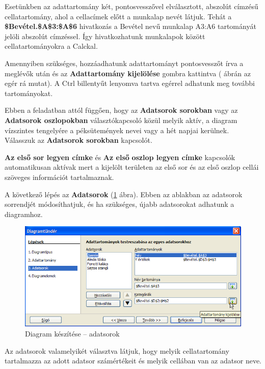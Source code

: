 Esetünkben az adattartomány két, pontosvesszővel
elválasztott, abszolút címzésű cellatartomány, ahol a
cellacímek előtt a munkalap nevét látjuk. Tehát a
\textbf{\$Bevétel.\$A\$3:\$A\$6} hivatkozás a Bevétel nevű
munkalap A3:A6 tartományát jelöli abszolút címzéssel. Így
hivatkozhatunk munkalapok között cellatartományokra a Calckal.

Amennyiben szükséges, hozzáadhatunk adattartományt
pontosvesszőt írva a meglévők után és az
\textbf{Adattartomány kijelölése} gombra kattintva (
ábrán az egér rá mutat). A Ctrl billentyűt lenyomva tartva
egérrel adhatunk meg további tartományokat. 

Ebben a feladatban attól függően, hogy az \textbf{Adatsorok
sorokban} vagy az \textbf{Adatsorok oszlopokban} választókapcsoló
közül melyik aktív, a diagram vízszintes tengelyére a
péksütemények nevei vagy a hét napjai kerülnek. Válasszuk
az \textbf{Adatsorok sorokban} kapcsolót.

\textbf{Az első sor legyen címke} és \textbf{Az
első}\textbf{ oszlop legyen címke} kapcsolók
automatikusan aktívak mert  a kijelölt területen az első sor
és az első oszlop cellái szöveges információt
tartalmaznak.

A következő lépés az \textbf{Adatsorok} (\ref{DiagramAdatsor} ábra).
Ebben az ablakban az adatsorok sorrendjét módosíthatjuk, és ha
szükséges, újabb adatsorokat adhatunk a diagramhoz.

\begin{figure}[!h]
\begin{center}
\includegraphics[width=15.499cm]{oocalcv2-img55.png}
\caption{Diagram készítése --  adatsorok}\label{DiagramAdatsor}
\end{center}
\end{figure}

Az adatsorok valamelyikét választva látjuk, hogy melyik
cellatartomány tartalmazza az adott adatsor számértékeit és
melyik cellában van az adatsor neve.

